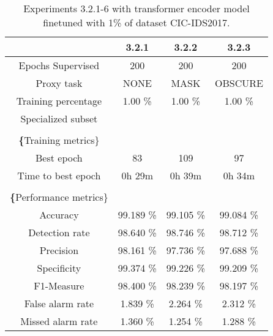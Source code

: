 \begin{table}[htb]
    \centering
    \begin{tabular}{@{}cccc@{}}
        \toprule
         & 3.2.1 & 3.2.2 & 3.2.3 \\
        \midrule
        Epochs Supervised &  200 &  200 &  200 \\
        Proxy task &  NONE &  MASK &  OBSCURE \\
        Training percentage &  1.00 \% &  1.00 \% &  1.00 \% \\
        Specialized subset &   &   &   \\
         \\
        \textbf\{Training metrics\} &  &  &  \\
        Best epoch &  83 &  109 &  97 \\
        Time to best epoch &  0h 29m &  0h 39m &  0h 34m \\
         \\
        \textbf\{Performance metrics\} &  &  &  \\
        Accuracy &  99.189 \% &  99.105 \% &  99.084 \% \\
        Detection rate &  98.640 \% &  98.746 \% &  98.712 \% \\
        Precision &  98.161 \% &  97.736 \% &  97.688 \% \\
        Specificity &  99.374 \% &  99.226 \% &  99.209 \% \\
        F1-Measure &  98.400 \% &  98.239 \% &  98.197 \% \\
        False alarm rate &  1.839 \% &  2.264 \% &  2.312 \% \\
        Missed alarm rate &  1.360 \% &  1.254 \% &  1.288 \% \\
        \bottomrule
    \end{tabular}
    \caption{Experiments 3.2.1-6 with transformer encoder model finetuned with 1\% of dataset CIC-IDS2017.}
    \label{table:results:lstm:stats_flows_1}
\end{table}